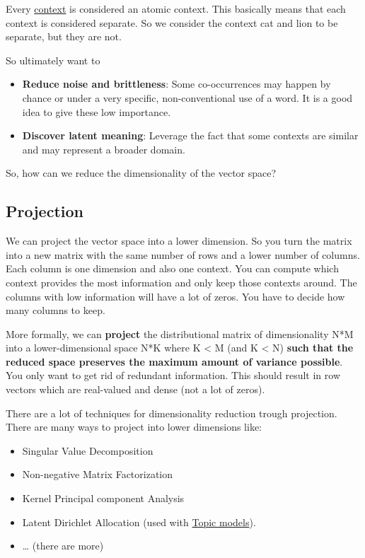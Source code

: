 \documentclass[
  11pt,
  british,
]{article}
\providecommand{\tightlist}{%
  \setlength{\itemsep}{0pt}\setlength{\parskip}{0pt}}
\begin{document}
Every \href{Context.md}{context} is considered an atomic context. This
basically means that each context is considered separate. So we consider
the context cat and lion to be separate, but they are not.

So ultimately want to

\begin{itemize}
\tightlist
\item
  \textbf{Reduce noise and brittleness}: Some co-occurrences may happen
  by chance or under a very specific, non-conventional use of a word. It
  is a good idea to give these low importance.
\item
  \textbf{Discover latent meaning}: Leverage the fact that some contexts
  are similar and may represent a broader domain.
\end{itemize}

So, how can we reduce the dimensionality of the vector space?

\hypertarget{projection}{%
\subsection{Projection}\label{projection}}

We can project the vector space into a lower dimension. So you turn the
matrix into a new matrix with the same number of rows and a lower number
of columns. Each column is one dimension and also one context. You can
compute which context provides the most information and only keep those
contexts around. The columns with low information will have a lot of
zeros. You have to decide how many columns to keep.

More formally, we can \textbf{project} the distributional matrix of
dimensionality N*M into a lower-dimensional space N*K where K
\textless{} M (and K \textless{} N) \textbf{such that the reduced space
preserves the maximum amount of variance possible}. You only want to get
rid of redundant information. This should result in row vectors which
are real-valued and dense (not a lot of zeros).

There are a lot of techniques for dimensionality reduction trough
projection. There are many ways to project into lower dimensions like:

\begin{itemize}
\tightlist
\item
  Singular Value Decomposition
\item
  Non-negative Matrix Factorization
\item
  Kernel Principal component Analysis
\item
  Latent Dirichlet Allocation (used with
  \href{Word\%20similarity.md}{Topic models}).
\item
  \ldots{} (there are more)
\end{itemize}
\end{document}
